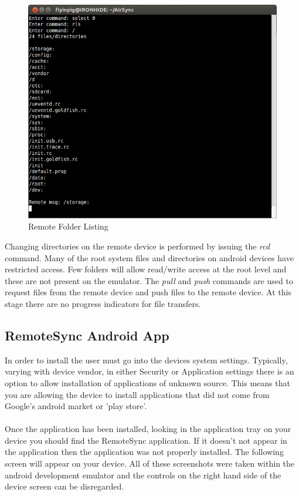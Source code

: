 \documentclass[12pt]{article}
\begin{document}
\begin{figure}[H]
\center
\includegraphics[width=1\textwidth]{jar-remote-listing.png}
\caption{Remote Folder Listing}
\end{figure}

Changing directories on the remote device is performed by issuing the \emph{rcd} command. Many of the root system files and directories on android devices have restricted access. Few folders will allow read/write access at the root level and these are not present on the emulator. The \emph{pull} and \emph{push} commands are used to request files from the remote device and push files to the remote device. At this stage there are no progress indicators for file transfers.

\subsection{RemoteSync Android App}
In order to install the user must go into the devices system settings. Typically, varying with device vendor, in either Security or Application settings there is an option to allow installation of applications of unknown source. This means that you are allowing the device to install applications that did not come from Google's android market or 'play store'.\\\\
Once the application has been installed, looking in the application tray on your device you should find the RemoteSync application. If it doesn't not appear in the application then the application was not properly installed. The following screen will appear on your device. All of these screenshots were taken within the android development emulator and the controls on the right hand side of the device screen can be disregarded.\\
\end{document}
